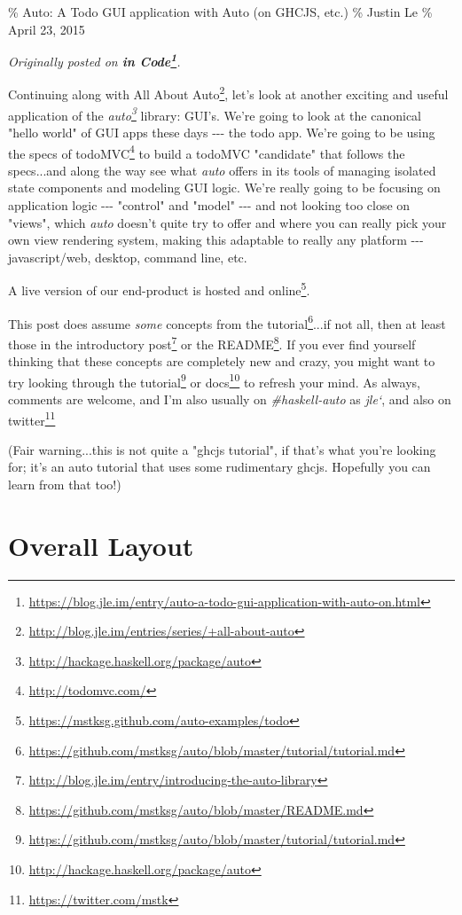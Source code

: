 \documentclass[]{article}
\renewcommand{\href}[2]{#2\footnote{\url{#1}}}
\begin{document}
\% Auto: A Todo GUI application with Auto (on GHCJS, etc.) \% Justin Le \% April
23, 2015

\emph{Originally posted on
\textbf{\href{https://blog.jle.im/entry/auto-a-todo-gui-application-with-auto-on.html}{in
Code}}.}

Continuing along with
\href{http://blog.jle.im/entries/series/+all-about-auto}{All About Auto}, let's
look at another exciting and useful application of the
\emph{\href{http://hackage.haskell.org/package/auto}{auto}} library: GUI's.
We're going to look at the canonical "hello world" of GUI apps these days
-\/-\/- the todo app. We're going to be using the specs of
\href{http://todomvc.com/}{todoMVC} to build a todoMVC "candidate" that follows
the specs...and along the way see what \emph{auto} offers in its tools of
managing isolated state components and modeling GUI logic. We're really going to
be focusing on application logic -\/-\/- "control" and "model" -\/-\/- and not
looking too close on "views", which \emph{auto} doesn't quite try to offer and
where you can really pick your own view rendering system, making this adaptable
to really any platform -\/-\/- javascript/web, desktop, command line, etc.

A live version of our end-product
\href{https://mstksg.github.com/auto-examples/todo}{is hosted and online}.

This post does assume \emph{some} concepts from the
\href{https://github.com/mstksg/auto/blob/master/tutorial/tutorial.md}{tutorial}...if
not all, then at least those in the
\href{http://blog.jle.im/entry/introducing-the-auto-library}{introductory post}
or the \href{https://github.com/mstksg/auto/blob/master/README.md}{README}. If
you ever find yourself thinking that these concepts are completely new and
crazy, you might want to try looking through the
\href{https://github.com/mstksg/auto/blob/master/tutorial/tutorial.md}{tutorial}
or \href{http://hackage.haskell.org/package/auto}{docs} to refresh your mind. As
always, comments are welcome, and I'm also usually on \emph{\#haskell-auto} as
\emph{jle`}, and also on \href{https://twitter.com/mstk}{twitter}

(Fair warning...this is not quite a "ghcjs tutorial", if that's what you're
looking for; it's an auto tutorial that uses some rudimentary ghcjs. Hopefully
you can learn from that too!)

\section{Overall Layout}
\end{document}
